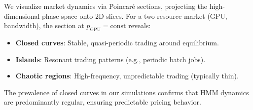 We visualize market dynamics via Poincar\'e sections, projecting the high-dimensional phase space onto 2D slices. For a two-resource market (GPU, bandwidth), the section at $p_{\text{GPU}} = \text{const}$ reveals:

\begin{itemize}[leftmargin=1.1em]
    \item \textbf{Closed curves}: Stable, quasi-periodic trading around equilibrium.
    \item \textbf{Islands}: Resonant trading patterns (e.g., periodic batch jobs).
    \item \textbf{Chaotic regions}: High-frequency, unpredictable trading (typically thin).
\end{itemize}

The prevalence of closed curves in our simulations confirms that HMM dynamics are predominantly regular, ensuring predictable pricing behavior.

